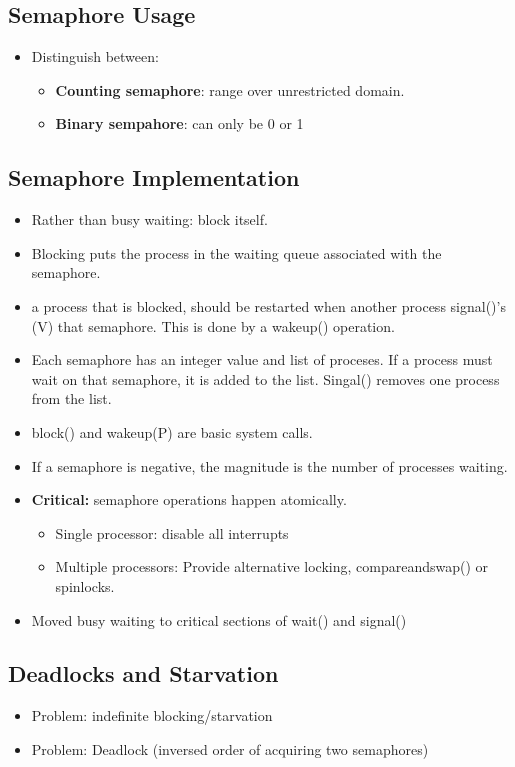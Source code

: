 \documentclass[10pt]{report}
\begin{document}
		\subsection{Semaphore Usage}
			\begin{itemize}
				\item Distinguish between:
				\begin{itemize}
					\item \textbf{Counting semaphore}: range over unrestricted domain.
					\item \textbf{Binary sempahore}: can only be 0 or 1
				\end{itemize}
			\end{itemize}

		\subsection{Semaphore Implementation}
			\begin{itemize}
				\item Rather than busy waiting: block itself.
				\item Blocking puts the process in the waiting queue associated with the semaphore.
				\item a process that is blocked, should be restarted when another process signal()'s (V) that semaphore. This is done by a wakeup() operation.
				\item Each semaphore has an integer value and list of proceses. If a process must wait on that semaphore, it is added to the list. Singal() removes one process from the list.
				\item block() and wakeup(P) are basic system calls.
				\item If a semaphore is negative, the magnitude is the number of processes waiting.
				\item \textbf{Critical:} semaphore operations happen atomically.
				\begin{itemize}
					\item Single processor: disable all interrupts
					\item Multiple processors: Provide alternative locking, compare\textunderscore and\textunderscore swap() or spinlocks.
				\end{itemize}
				\item Moved busy waiting to critical sections of wait() and signal()
			\end{itemize}

		\subsection{Deadlocks and Starvation}
			\begin{itemize}
				\item Problem: indefinite blocking/starvation
				\item Problem: Deadlock (inversed order of acquiring two semaphores)
			\end{itemize}
\end{document}
